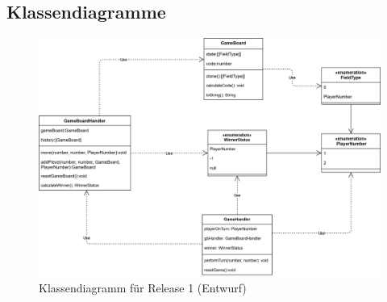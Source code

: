 \documentclass[titlepage]{scrartcl}
\begin{document}
\subsection{Klassendiagramme}
\begin{figure}[ht]
\includegraphics[width=\textwidth]{Klassendiagramme/Aktuell.png}
\caption{Klassendiagramm für Release 1 (Entwurf)}
\end{figure}
\end{document}
